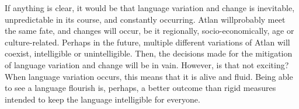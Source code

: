 If anything is clear, it would be that language variation and change is inevitable, unpredictable in its course, and constantly occurring. Atlan willprobably meet the same fate, and changes will occur, be it regionally, socio-economically, age or culture-related. Perhaps in the future, multiple different variations of Atlan will coexist, intelligible or unintelligible. Then, the decisions made for the mitigation of language variation and change will be in vain. However, is that not exciting? When language variation occurs, this means that it is alive and fluid. Being able to see a language flourish is, perhaps, a better outcome than rigid measures intended to keep the language intelligible for everyone.



